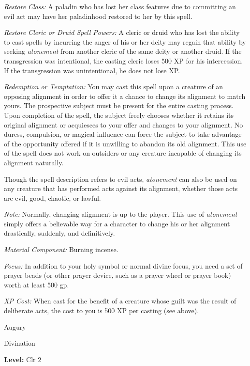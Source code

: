 \documentclass{article}
\begin{document}
\textit{Restore Class: }A paladin who has lost her class features due to committing 
an evil act may have her paladinhood restored to her by this spell.

\textit{Restore Cleric or Druid Spell Powers: }A cleric or druid who has lost the 
ability to cast spells by incurring the anger of his or her deity may regain that 
ability by seeking \textit{atonement }from another cleric of the same deity or 
another druid. If the transgression was intentional, the casting cleric loses 500 
XP for his intercession. If the transgression was unintentional, he does not lose 
XP.

\textit{Redemption or Temptation: }You may cast this spell upon a creature of an 
opposing alignment in order to offer it a chance to change its alignment to match 
yours. The prospective subject must be present for the entire casting process. 
Upon completion of the spell, the subject freely chooses whether it retains its 
original alignment or acquiesces to your offer and changes to your alignment. No 
duress, compulsion, or magical influence can force the subject to take advantage 
of the opportunity offered if it is unwilling to abandon its old alignment. This 
use of the spell does not work on outsiders or any creature incapable of changing 
its alignment naturally.

Though the spell description refers to evil acts, \textit{atonement }can also be 
used on any creature that has performed acts against its alignment, whether those 
acts are evil, good, chaotic, or lawful.

\textit{Note: }Normally, changing alignment is up to the player. This use of \textit{atonement 
}simply offers a believable way for a character to change his or her alignment 
drastically, suddenly, and definitively.

\textit{Material Component: }Burning incense.

\textit{Focus: }In addition to your holy symbol or normal divine focus, you need 
a set of prayer beads (or other prayer device, such as a prayer wheel or prayer 
book) worth at least 500 gp.

\textit{XP Cost: }When cast for the benefit of a creature whose guilt was the result 
of deliberate acts, the cost to you is 500 XP per casting (see above).

\vspace{12pt}
Augury

Divination

\textbf{Level:} Clr 2
\end{document}
